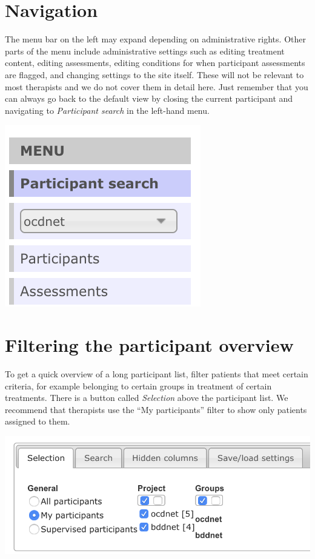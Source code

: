 \documentclass[]{book}
\theoremstyle{definition}
\theoremstyle{definition}
\theoremstyle{definition}
\theoremstyle{remark}
\begin{document}
\hypertarget{navigation}{%
\section{Navigation}\label{navigation}}

The menu bar on the left may expand depending on administrative rights.
Other parts of the menu include administrative settings such as editing
treatment content, editing assessments, editing conditions for when
participant assessments are flagged, and changing settings to the site
itself. These will not be relevant to most therapists and we do not
cover them in detail here. Just remember that you can always go back to
the default view by closing the current participant and navigating to
\emph{Participant search} in the left-hand menu.

\includegraphics{images/therapist-menu.png}

\hypertarget{filtering-the-participant-overview}{%
\section{Filtering the participant
overview}\label{filtering-the-participant-overview}}

To get a quick overview of a long participant list, filter patients that
meet certain criteria, for example belonging to certain groups in
treatment of certain treatments. There is a button called
\emph{Selection} above the participant list. We recommend that
therapists use the ``My participants'' filter to show only patients
assigned to them.

\includegraphics{images/filter-participants.png}
\end{document}
